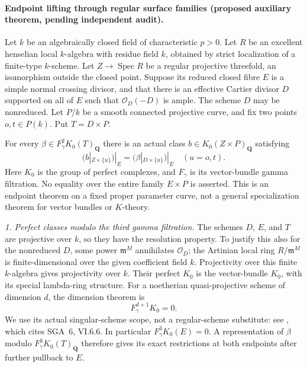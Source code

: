 \paragraph{Endpoint lifting through regular surface families
(proposed auxiliary theorem, pending independent audit).}
Let $k$ be an algebraically closed field of characteristic $p>0$.
Let $R$ be an excellent henselian local $k$-algebra with residue field
$k$, obtained by strict localization of a finite-type $k$-scheme.
Let $Z\to\operatorname{Spec}R$ be a regular projective threefold,
an isomorphism outside the closed point.  Suppose its reduced closed
fibre $E$ is a simple normal crossing divisor, and that there is an
effective Cartier divisor $D$ supported on all of $E$ such that
$\mathcal O_D(-D)$ is ample.  The scheme $D$ may be nonreduced.
Let $P/k$ be a smooth connected projective curve, and fix two points
$o,t\in P(k)$.  Put $T=D\times P$.

For every $\beta\in F_\gamma^2K_0(T)_{\mathbf Q}$ there is an actual
class $b\in K_0(Z\times P)_{\mathbf Q}$ satisfying
\begin{equation}
 (b|_{Z\times\{u\}})|_E
       =(\beta|_{D\times\{u\}})|_E\quad(u=o,t).
                                                        \tag{EL.1}
\end{equation}
Here $K_0$ is the group of perfect complexes, and $F_\gamma$ is its
vector-bundle gamma filtration.  No equality over the entire family
$E\times P$ is asserted.  This is an endpoint theorem on a fixed
proper parameter curve, not a general specialization theorem for
vector bundles or $K$-theory.

\emph{1. Perfect classes modulo the third gamma filtration.}
The schemes $D$, $E$, and $T$ are projective over $k$, so they have
the resolution property.  To justify this also for the nonreduced
$D$, some power $\mathfrak m^M$ annihilates $\mathcal O_D$; the
Artinian local ring $R/\mathfrak m^M$ is finite-dimensional over
the given coefficient field $k$.  Projectivity over this finite
$k$-algebra gives projectivity over $k$.
Their perfect $K_0$ is the vector-bundle
$K_0$, with its special lambda-ring structure.  For a noetherian
quasi-projective scheme of dimension $d$, the dimension theorem is
\begin{equation}
                         F_\gamma^{d+1}K_0=0.
                                                        \tag{EL.2}
\end{equation}
We use its actual singular-scheme scope, not a regular-scheme
substitute: see \citet[Chapter II, Remark 8.8.5, p.~83]
{D_Weibel2013KbookII}, which cites SGA~6, VI.6.6.
In particular $F_\gamma^3K_0(E)=0$.  A representation of $\beta$
modulo $F_\gamma^3K_0(T)_{\mathbf Q}$ therefore gives its exact
restrictions at both endpoints after further pullback to $E$.

